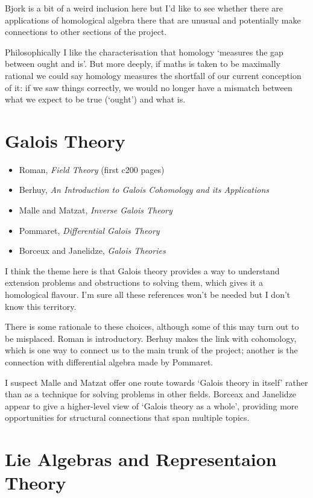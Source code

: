 \documentclass[article]{article}
\begin{document}
Bjork is a bit of a weird inclusion here but I'd like to see whether there are applications of homological algebra there that are unusual and potentially make connections to other sections of the project.

Philosophically I like the characterisation that homology `measures the gap between ought and is'. But more deeply, if maths is taken to be maximally rational we could say homology measures the shortfall of our current conception of it: if we saw things correctly, we would no longer have a mismatch between what we expect to be true (`ought') and what is.

\section{Galois Theory}

\begin{itemize}
	\item{Roman, \textit{Field Theory} (first c200 pages)}
	\item{Berhuy, \textit{An Introduction to Galois Cohomology and its Applications}}
	\item{Malle and Matzat, \textit{Inverse Galois Theory}}
	\item{Pommaret, \textit{Differential Galois Theory}}
	\item{Borceux and Janelidze, \textit{Galois Theories}}
\end{itemize}

I think the theme here is that Galois theory provides a way to understand extension problems and obstructions to solving them, which gives it a homological flavour. I'm sure all these references won't be needed but I don't know this territory.

There is some rationale to these choices, although some of this may turn out to be misplaced. Roman is introductory. Berhuy makes the link with cohomology, which is one way to connect us to the main trunk of the project; another is the connection with differential algebra made by Pommaret. 

I suspect Malle and Matzat offer one route towards `Galois theory in itself' rather than as a technique for solving problems in other fields. Borceax and Janelidze appear to give a higher-level view of `Galois theory as a whole', providing more opportunities for structural connections that span multiple topics.

\section{Lie Algebras and Representaion Theory}
\end{document}
